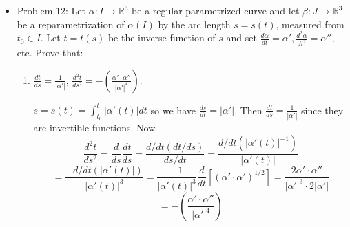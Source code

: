 \documentclass[a4paper,17pt]{extarticle}
\theoremstyle{definition}
\renewcommand{\skip}{\par\null\par}
\newcommand{\R}{\mathbb{R}}
\begin{document}
\begin{itemize}
\begin{enumerate}[label=\alph*.]
        \item Show that the vector product of two vectors is invariant under orthogonal transformations with positive determinant. Is the assertion still true if we drop the condition on the determinant?\skip $$\rho u\times\rho v=(det\rho)(u\times v)$$ Therefore, the vector product of two vectors is invariant if $det\rho=1$. If, on the other hand, $det\rho=-1$, then $\rho u\times\rho v\neq u\times v$.
        \item Show that the arc length, the curvature, and the torsion of a parametrized curve are invariant under rigid motions.\skip\begin{proof}Let $\alpha:I\to\R^3$ be a parametrized curve and $T:\R^3\to\R^3$ a rigid motion. Let $\mathcal{L}$ be its length, $\kappa$ its curvature and $\tau$ its torsion. Since translations and orthogonal transformations preserve norm, $T$ preserves norm.\skip Arc length: $$\mathcal{L}_T(\alpha)=\int_{t_0}^t||T\alpha(t)||dt=\int_{t_0}^t||\alpha(t)||=\mathcal{L}(\alpha)$$Curvature, $\kappa(s)=||\alpha''(s)||$. Since $T$ is a linear transformation, it holds that $(T\alpha(s))''=T\alpha''(s)$. Therefore: $$\kappa_T(s)=||(T\alpha(s))''||=||T\alpha''(s)||=||\alpha''(s)||=\kappa(s)$$ For torsion, recall $\tau(s)n(s)=b'(s)$. $$\tau(s)n(s)=b'(s)=(t(s)\wedge n(s))'$$ $$=t'(s)\wedge n(s)+t(s)\wedge n'(s)$$ $$=\kappa(s)n(s)\wedge n(s)+\alpha'(s)\wedge n'(s)$$ $$=\alpha'(s)\wedge n'(s)$$ Then $$\tau_T(s)Tn(s)$$ $$=T\alpha'(s)\wedge Tn'(s)$$ $$=T(\alpha'(s)\wedge n'(s))$$ $$=T(\tau(s)n(s))$$ $$=\tau(s)Tn(s)$$ So $\tau_T(s)=\tau(s)$. (Regretting using T as the rigid motion, $\tau_T$ looks weird.)
    \end{proof}
    \end{enumerate}
    \item Problem 12: Let $\alpha:I\to\R^3$ be a regular parametrized curve and let $\beta:J\to\R^3$ be a reparametrization of $\alpha(I)$ by the arc length $s=s(t)$, measured from $t_0\in I$. Let $t=t(s)$ be the inverse function of $s$ and set $\frac{d\alpha}{dt}=\alpha',\frac{d^2\alpha}{dt^2}=\alpha'',$ etc. Prove that:\begin{enumerate}[label=\alph*.]
        \item $\frac{dt}{ds}=\frac{1}{|\alpha'|}$, $\frac{d^2t}{ds^2}=-\left(\frac{\alpha'\cdot\alpha''}{|\alpha'|^4}\right)$.\skip$s=s(t)=\int_{t_0}^t|\alpha'(t)|dt$ so we have $\frac{ds}{dt}=|\alpha'|$. Then $\frac{dt}{ds}=\frac{1}{|\alpha'|}$ since they are invertible functions. Now $$\frac{d^2t}{ds^2}=\frac{d}{ds}\frac{dt}{ds}=\frac{d/dt(dt/ds)}{ds/dt}=\frac{d/dt(|\alpha'(t)|^{-1})}{|\alpha'(t)|}$$ $$=\frac{-d/dt(|\alpha'(t)|)}{|\alpha'(t)|^3}=\frac{-1}{|\alpha'(t)|^3}\frac{d}{dt}[(\alpha'\cdot\alpha')^{1/2}]=\frac{2\alpha'\cdot\alpha''}{|\alpha'|^3\cdot2|\alpha'|}$$ $$=-\left(\frac{\alpha'\cdot\alpha''}{|\alpha'|^4}\right)$$

\end{enumerate}
\end{itemize}
\end{document}
